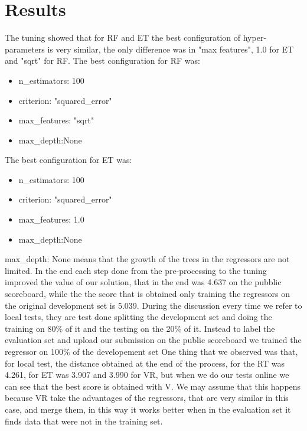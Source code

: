 \documentclass[conference]{IEEEtran}
\begin{document}
\section{Results}


The tuning showed that for RF and ET the best configuration of hyper-parameters is very similar, the only difference was in "max features", 1.0 for ET and "sqrt" for RF.
The best configuration for RF was:

\begin{itemize}
    \item n\_estimators: 100
    \item criterion: "squared\_error"
    \item max\_features: "sqrt"
    \item max\_depth:None
\end{itemize}

The best configuration for ET was:
\begin{itemize}
    \item n\_estimators: 100
    \item criterion: "squared\_error"
    \item max\_features: 1.0
    \item max\_depth:None
\end{itemize}
max\_depth: None means that the growth of the trees in the regressors are not limited.
In the end each step done from the pre-processing to the tuning improved the value of our solution, that in the end was 4.637 on the pubblic scoreboard, while the the score that is obtained only training the regressors on the original development set is 5.039.
During the discussion every time we refer to local tests, they are test done splitting the development set and doing the training on 80\% of it and the testing on the 20\% of it. Instead to label the evaluation set and upload our submission on the public scoreboard we trained the regressor on 100\% of the developement set
One thing that we observed was that, for local test, the distance obtained at the end of the process, for the RT was 4.261, for ET was 3.907 and 3.990 for VR, but when we do our tests online we can see that the best score is obtained with V. We may assume that this happens because VR take the advantages of the regressors, that are very similar in this case, and merge them, in this way it works better when in the evaluation set it finds data that were not in the training set.
\end{document}
